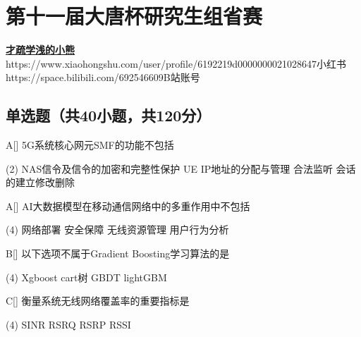 \chapter{第十一届大唐杯研究生组省赛}
\fancyhead[R]{\color{H6}\kaishu\rightmark\,}

\date{2024年4月19日}{}{\href{https://github.com/xubenshan/dtcup}{\textbf{才疏学浅的小熊}}}
{}
{https://www.xiaohongshu.com/user/profile/6192219d0000000021028647}{小红书}
{https://space.bilibili.com/692546609}{B站账号}



\section{单选题（共40小题，共120分）}



\begin{choice}{A}[]
    5G系统核心网元SMF的功能不包括
    \begin{tasks}(2)
        \task NAS信令及信令的加密和完整性保护
        \task UE IP地址的分配与管理
        \task 合法监听
        \task 会话的建立修改删除
    \end{tasks}
\end{choice}


\begin{choice}{A}[]
    AI大数据模型在移动通信网络中的多重作用中不包括
    \begin{tasks}(4)
        \task 网络部署
        \task 安全保障
        \task 无线资源管理
        \task 用户行为分析
    \end{tasks}
\end{choice}




\begin{choice}{B}[]
    以下选项不属于Gradient Boosting学习算法的是
    \begin{tasks}(4)
        \task Xgboost
        \task cart树
        \task GBDT
        \task lightGBM
    \end{tasks}
\end{choice}



\begin{choice}{C}[]
    衡量系统无线网络覆盖率的重要指标是
    \begin{tasks}(4)
        \task SINR
        \task RSRQ
        \task RSRP
        \task RSSI
    \end{tasks}
\end{choice}


